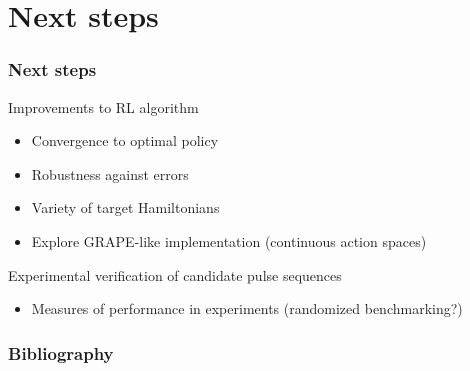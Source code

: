 \documentclass{beamer}
\begin{document}
\section{Next steps}

\begin{frame}
\frametitle{Next steps}

Improvements to RL algorithm

\begin{itemize}
    \item Convergence to optimal policy
    \item Robustness against errors
    \item Variety of target Hamiltonians
    \item Explore GRAPE-like implementation (continuous action spaces)
\end{itemize}

\pause

Experimental verification of candidate pulse sequences

\begin{itemize}
    \item Measures of performance in experiments (randomized benchmarking?)
\end{itemize}

\end{frame}

\begin{frame}[allowframebreaks]
\frametitle{Bibliography}

\printbibliography

\end{frame}
\end{document}
